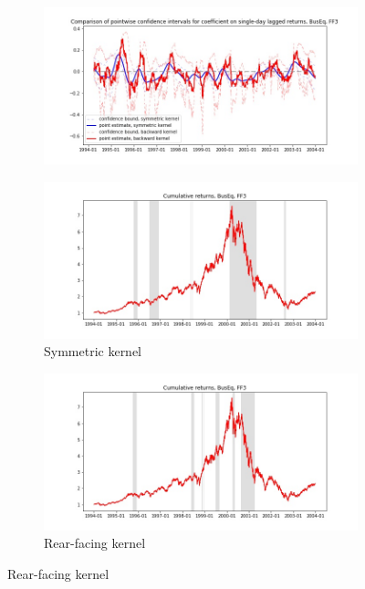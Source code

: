 \documentclass{article}
\begin{document}
\newpage

\begin{figure}

\centering

  \begin{subfigure}[b]{\textwidth}
    \includegraphics[width=\textwidth]{BusEq/pointwiseCIs_layered_FF3.jpg}
    \label{fig:1}
  \end{subfigure}
  \begin{subfigure}[b]{0.45\textwidth}
    \includegraphics[width=\textwidth]{BusEq/full_cumrets_ofint_FF3.jpg}
    \caption*{Symmetric kernel}
    \label{fig:2}
  \end{subfigure}
   \begin{subfigure}[b]{0.45\textwidth}
    \includegraphics[width=\textwidth]{BusEq/bwunif_full_cumrets_ofint_FF3.jpg}
    \caption*{Rear-facing kernel}
    \label{fig:2}
  \end{subfigure}
  
\end{figure}
\end{document}
